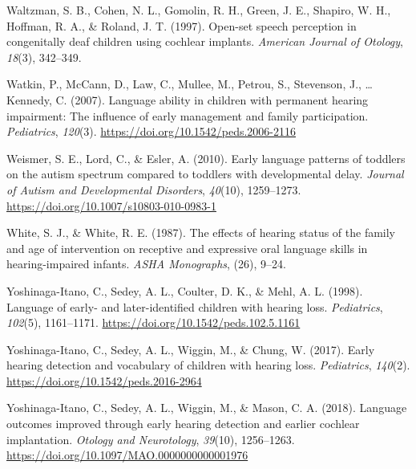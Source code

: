 \documentclass[english,man,floatsintext]{apa6}
\begin{document}
\leavevmode\hypertarget{ref-waltzman1997}{}%
Waltzman, S. B., Cohen, N. L., Gomolin, R. H., Green, J. E., Shapiro, W. H., Hoffman, R. A., \& Roland, J. T. (1997). Open-set speech perception in congenitally deaf children using cochlear implants. \emph{American Journal of Otology}, \emph{18}(3), 342--349.

\leavevmode\hypertarget{ref-watkin2007}{}%
Watkin, P., McCann, D., Law, C., Mullee, M., Petrou, S., Stevenson, J., \ldots{} Kennedy, C. (2007). Language ability in children with permanent hearing impairment: The influence of early management and family participation. \emph{Pediatrics}, \emph{120}(3). \url{https://doi.org/10.1542/peds.2006-2116}

\leavevmode\hypertarget{ref-weismer2010}{}%
Weismer, S. E., Lord, C., \& Esler, A. (2010). Early language patterns of toddlers on the autism spectrum compared to toddlers with developmental delay. \emph{Journal of Autism and Developmental Disorders}, \emph{40}(10), 1259--1273. \url{https://doi.org/10.1007/s10803-010-0983-1}

\leavevmode\hypertarget{ref-white1987}{}%
White, S. J., \& White, R. E. (1987). The effects of hearing status of the family and age of intervention on receptive and expressive oral language skills in hearing-impaired infants. \emph{ASHA Monographs}, (26), 9--24.

\leavevmode\hypertarget{ref-yoshinaga-itano1998}{}%
Yoshinaga-Itano, C., Sedey, A. L., Coulter, D. K., \& Mehl, A. L. (1998). Language of early- and later-identified children with hearing loss. \emph{Pediatrics}, \emph{102}(5), 1161--1171. \url{https://doi.org/10.1542/peds.102.5.1161}

\leavevmode\hypertarget{ref-yoshinaga-itano2017}{}%
Yoshinaga-Itano, C., Sedey, A. L., Wiggin, M., \& Chung, W. (2017). Early hearing detection and vocabulary of children with hearing loss. \emph{Pediatrics}, \emph{140}(2). \url{https://doi.org/10.1542/peds.2016-2964}

\leavevmode\hypertarget{ref-yoshinaga-itano2018}{}%
Yoshinaga-Itano, C., Sedey, A. L., Wiggin, M., \& Mason, C. A. (2018). Language outcomes improved through early hearing detection and earlier cochlear implantation. \emph{Otology and Neurotology}, \emph{39}(10), 1256--1263. \url{https://doi.org/10.1097/MAO.0000000000001976}
\end{document}
